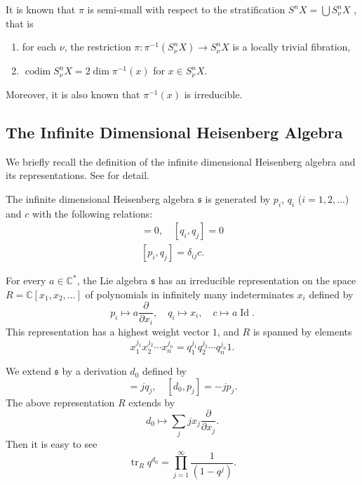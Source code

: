 \documentclass[12pt]{amsart}
\renewcommand{\frak}{\mathfrak}
\theoremstyle{definition}
\theoremstyle{remark}
\numberwithin{equation}{section}
\newcommand{\C}{{\mathbb C}}
\newcommand{\tr}{\operatorname{tr}}
\newcommand{\codim}{\operatorname{codim}}
\begin{document}
It is known that $\pi$ is semi-small with respect to the
stratification $S^n X = \bigcup S^n_\nu X$ \cite{Iar}, that is
\begin{enumerate}
\item for each $\nu$, the restriction
$\pi\colon \pi^{-1}(S^n_\nu X)\to S^n_\nu X$ is a locally trivial
fibration,
\item $\codim S^n_\nu X = 2\dim \pi^{-1}(x)$ for $x\in S^n_\nu X$.
\end{enumerate}
Moreover, it is also known that $\pi^{-1}(x)$ is irreducible.
%
\subsection{The Infinite Dimensional Heisenberg Algebra}
\label{subsec:Heisen}
%
We briefly recall the definition of the infinite dimensional
Heisenberg algebra and its representations. See \cite[\S9.13]{Kac} for
detail.

The infinite dimensional Heisenberg algebra $\frak s$ is generated by
$p_i$, $q_i$ ($i=1,2,\dots$) and $c$ with the following relations:
\begin{gather}
  [p_i, p_j] = 0, \quad [q_i, q_j] = 0 \label{eq:rel1}\\
  [p_i, q_j] = \delta_{ij} c. \label{eq:rel2}
\end{gather}

For every $a\in\C^*$, the Lie algebra $\frak s$ has an irreducible
representation on the space $R = \C[x_1, x_2,\dots]$ of
polynomials in infinitely many indeterminates $x_i$ defined by
\begin{equation*}
  p_i \mapsto a \frac{\partial}{\partial x_i}, \quad
  q_i \mapsto x_i, \quad
  c \mapsto a \operatorname{Id}.
\end{equation*}
This representation has a highest weight vector $1$, and $R$ is
spanned by elements
\begin{equation*}
  x_1^{j_1} x_2^{j_2} \cdots x_n^{j_n} =
  q_1^{j_1} q_2^{j_2} \cdots q_n^{j_n} 1.
\end{equation*}

We extend $\frak s$ by a derivation $d_0$ defined by
\begin{equation*}
  [d_0, q_j] = j q_j, \quad [d_0, p_j] = - j p_j.
\end{equation*}
The above representation $R$ extends by
\begin{equation*}
  d_0 \mapsto \sum_j jx_j\frac{\partial}{\partial x_j}.
\end{equation*}
Then it is easy to see
\begin{equation}
  \tr_R q^{d_0} = \prod_{j=1}^\infty \frac 1{(1 - q^j)}.
  \label{eq:char}
\end{equation}
\end{document}
